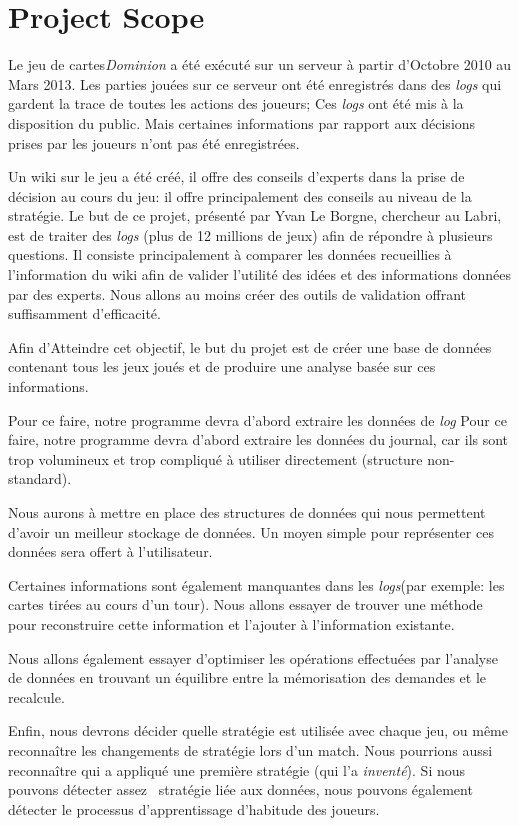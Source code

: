 \documentclass{scrreprt}
\begin{document}
\section{Project Scope}
  Le jeu de cartes\textit{Dominion} a été exécuté sur un serveur à partir d'Octobre 2010 au Mars 2013. Les parties jouées sur ce serveur ont été enregistrés dans des \textit{logs} qui gardent la trace de toutes les actions des joueurs; Ces \textit{logs} ont été mis à la disposition du public. Mais certaines informations par rapport aux décisions prises par les joueurs n’ont pas été enregistrées.

  \newline Un wiki sur le jeu a été créé, il offre des conseils d'experts dans la prise de décision au cours du jeu: il offre principalement des conseils au niveau de la stratégie. Le but de ce projet, présenté par Yvan Le Borgne, chercheur au Labri, est de traiter des \textit{logs} (plus de 12 millions de jeux) afin de répondre à plusieurs questions. Il consiste principalement à comparer les données recueillies à l'information du wiki afin de valider l'utilité des idées et des informations données par des experts. Nous allons au moins créer des outils de validation offrant suffisamment d'efficacité.
  
Afin d'Atteindre cet objectif, le but du projet est de créer une base de données contenant tous les jeux joués et de produire une analyse basée sur ces informations.

  Pour ce faire, notre programme devra d'abord extraire les données de  \textit{log} Pour ce faire, notre programme devra d'abord extraire les données du journal, car ils sont trop volumineux et trop compliqué à utiliser directement (structure non-standard).

 Nous aurons à mettre en place des structures de données qui nous permettent d'avoir un meilleur stockage de données. Un moyen simple pour représenter ces données sera offert à l'utilisateur.

  Certaines informations sont également manquantes dans les \textit{logs}(par exemple: les cartes tirées au cours d'un tour). Nous allons essayer de trouver une méthode pour reconstruire cette information et l'ajouter à l'information existante.

  Nous allons également essayer d'optimiser les opérations effectuées par l'analyse de données en trouvant un équilibre entre la mémorisation des demandes et le recalcule.

  Enfin, nous devrons décider quelle stratégie est utilisée avec chaque jeu, ou même reconnaître les changements de stratégie lors d'un match. Nous pourrions aussi reconnaître qui a appliqué une première stratégie (qui l'a \textit{inventé}). Si nous pouvons détecter assez  stratégie liée aux données, nous pouvons également détecter le processus d'apprentissage d'habitude des joueurs.
\end{document}
